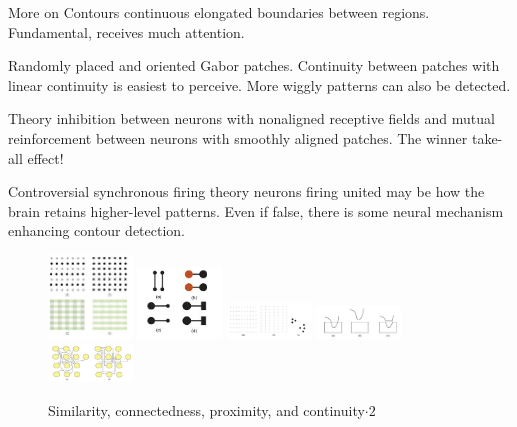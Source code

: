 \begin{mdframed}
\begin{multicols}{2}
\begin{compactdesc}
        \item[More on Contours] continuous elongated boundaries between
            regions. Fundamental, receives much attention.
        \item[Randomly placed and oriented] Gabor patches. Continuity
            between patches with linear continuity is easiest to perceive.
            More wiggly patterns can also be detected.
        \item[Theory] inhibition between neurons with nonaligned receptive
            fields and mutual reinforcement between neurons with smoothly
            aligned patches. The winner take-all effect!
        \item[Controversial synchronous firing theory] neurons firing united
            may be how the brain retains higher-level patterns.
            Even if false, there is some neural mechanism enhancing contour
            detection.
    \end{compactdesc}
    \begin{figure}[H]
        \centering
        \includegraphics[width=0.2\textwidth]{Gestalten/similarity.png}
        \includegraphics[width=0.2\textwidth]{Gestalten/connectedness.png}
        \includegraphics[width=0.2\textwidth]{Gestalten/proximity.png}
        \includegraphics[width=0.2\textwidth]{Gestalten/continuity.png}
        \includegraphics[width=0.2\textwidth]{Gestalten/continuity2.png}
        \caption{Similarity, connectedness, proximity, and continuity$\cdot2$}

\end{figure}
\end{multicols}
\end{mdframed}
